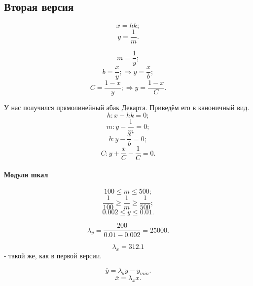 \subsection{Вторая версия}

$$x = hk;$$
$$y = \frac{1}{m}.$$

$$m = \frac{1}{y};$$
$$b = \frac{x}{y}; \Rightarrow y = \frac{x}{b};$$
$$C = \frac{1 - x}{y}; \Rightarrow y = \frac{1 - x}{C}.$$

У нас получился прямолинейный абак Декарта.
Приведём его в каноничный вид.
$$h: x - hk = 0;$$
$$m: y - \frac{1}{m} = 0;$$
$$b: y - \frac{x}{b} = 0;$$
$$C: y + \frac{x}{C} - \frac{1}{C} =0.$$

\paragraph{Модули шкал}
$$100 \le m \le 500;$$
$$\frac{1}{100} \ge \frac{1}{m} \ge \frac{1}{500};$$
$$0.002 \le y \le 0.01.$$

$$\lambda_y = \frac{200}{0.01 - 0.002} = 25000.$$


$$\lambda_x = 312.1$$
- такой же, как в первой версии.

$$\overline{y} = \lambda_y {y - y_{min}}.$$
$$\overline{x} = \lambda_x x.$$
